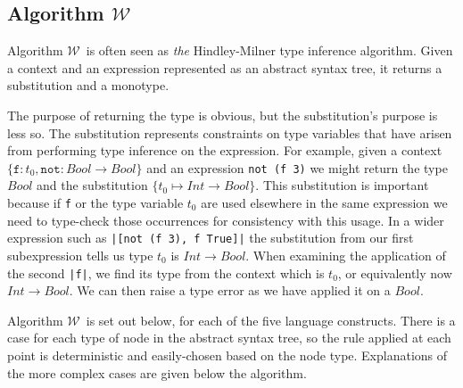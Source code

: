 \documentclass[a4paper,fleqn,oneside,12pt]{report}
\newcommand{\W}{$\mathcal{W}$}
\begin{document}
\subsection{Algorithm \texorpdfstring{\W}{W}}

Algorithm \W\ is often seen as \textit{the} Hindley-Milner type inference algorithm. Given a context and an expression represented as an abstract syntax tree, it returns a substitution and a monotype.

The purpose of returning the type is obvious, but the substitution's purpose is less so. The substitution represents constraints on type variables that have arisen from performing type inference on the expression. For example, given a context $\{ \mathtt{f} : t_0, \mathtt{not} : Bool \rightarrow Bool \}$ and an expression \texttt{not (f 3)} we might return the type $Bool$ and the substitution $\{ t_0 \mapsto Int \rightarrow Bool \}$. This substitution is important because if \texttt{f} or the type variable $t_0$ are used elsewhere in the same expression we need to type-check those occurrences for consistency with this usage. In a wider expression such as \texttt{|[not (f 3), f True]|} the substitution from our first subexpression tells us type $t_0$ is $Int \rightarrow Bool$. When examining the application of the second \texttt{|f|}, we find its type from the context which is $t_0$, or equivalently now $Int \rightarrow Bool$. We can then raise a type error as we have applied it on a $Bool$.

Algorithm \W\ is set out below, for each of the five language constructs. There is a case for each type of node in the abstract syntax tree, so the rule applied at each point is deterministic and easily-chosen based on the node type. Explanations of the more complex cases are given below the algorithm.
\end{document}
